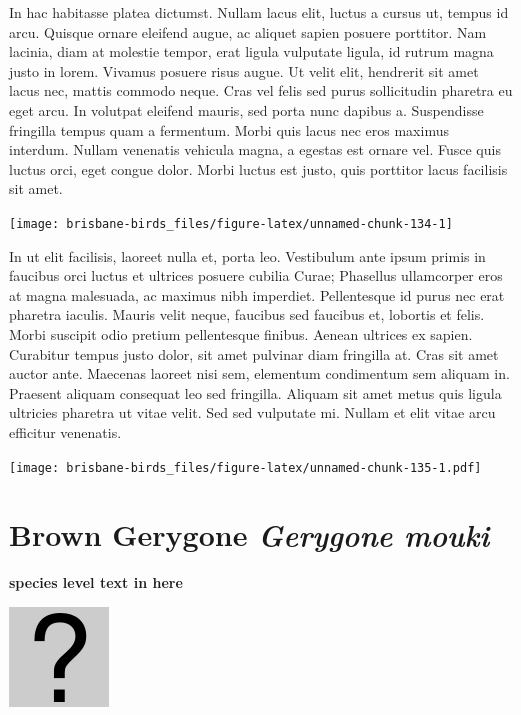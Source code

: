 \documentclass[]{book}
\let\origfigure\figure
\let\endorigfigure\endfigure
\renewenvironment{figure}[1][2] {
  \expandafter\origfigure\expandafter[H]
} {
  \endorigfigure
}
\begin{document}
In hac habitasse platea dictumst. Nullam lacus elit, luctus a cursus ut,
tempus id arcu. Quisque ornare eleifend augue, ac aliquet sapien posuere
porttitor. Nam lacinia, diam at molestie tempor, erat ligula vulputate
ligula, id rutrum magna justo in lorem. Vivamus posuere risus augue. Ut
velit elit, hendrerit sit amet lacus nec, mattis commodo neque. Cras vel
felis sed purus sollicitudin pharetra eu eget arcu. In volutpat eleifend
mauris, sed porta nunc dapibus a. Suspendisse fringilla tempus quam a
fermentum. Morbi quis lacus nec eros maximus interdum. Nullam venenatis
vehicula magna, a egestas est ornare vel. Fusce quis luctus orci, eget
congue dolor. Morbi luctus est justo, quis porttitor lacus facilisis sit
amet.

\begin{figure}
\texttt{[image: brisbane-birds\_files/figure-latex/unnamed-chunk-134-1]} \caption{insert figure caption}\label{fig:unnamed-chunk-134}
\end{figure}

In ut elit facilisis, laoreet nulla et, porta leo. Vestibulum ante ipsum
primis in faucibus orci luctus et ultrices posuere cubilia Curae;
Phasellus ullamcorper eros at magna malesuada, ac maximus nibh
imperdiet. Pellentesque id purus nec erat pharetra iaculis. Mauris velit
neque, faucibus sed faucibus et, lobortis et felis. Morbi suscipit odio
pretium pellentesque finibus. Aenean ultrices ex sapien. Curabitur
tempus justo dolor, sit amet pulvinar diam fringilla at. Cras sit amet
auctor ante. Maecenas laoreet nisi sem, elementum condimentum sem
aliquam in. Praesent aliquam consequat leo sed fringilla. Aliquam sit
amet metus quis ligula ultricies pharetra ut vitae velit. Sed sed
vulputate mi. Nullam et elit vitae arcu efficitur venenatis.

\begin{figure}
\centering
\texttt{[image: brisbane-birds\_files/figure-latex/unnamed-chunk-135-1.pdf]}
\caption{\label{fig:unnamed-chunk-135}insert figure caption}
\end{figure}

\section{\texorpdfstring{Brown Gerygone \emph{Gerygone
mouki}}{Brown Gerygone Gerygone mouki}}\label{brown-gerygone-gerygone-mouki}

\textbf{species level text in here}

\begin{figure}
\centering
\includegraphics{assets/missing.png}
\caption{No image for species}
\end{figure}
\end{document}
